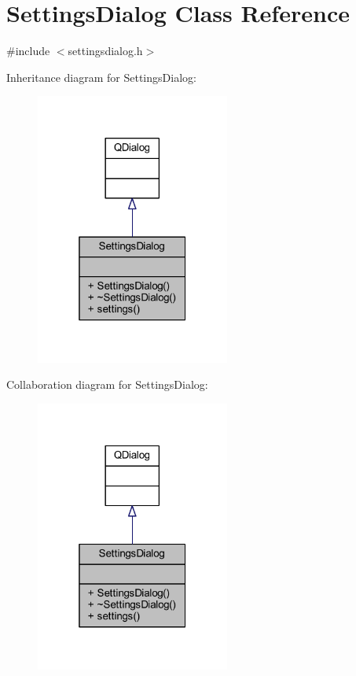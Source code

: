 \hypertarget{a00075}{\section{Settings\+Dialog Class Reference}
\label{a00075}
}


{\ttfamily \#include $<$settingsdialog.\+h$>$}



Inheritance diagram for Settings\+Dialog\+:
\nopagebreak
\begin{figure}[H]
\begin{center}
\leavevmode
\includegraphics[width=181pt]{dc/dea/a00558}
\end{center}
\end{figure}


Collaboration diagram for Settings\+Dialog\+:
\nopagebreak
\begin{figure}[H]
\begin{center}
\leavevmode
\includegraphics[width=181pt]{d2/d50/a00559}
\end{center}
\end{figure}
